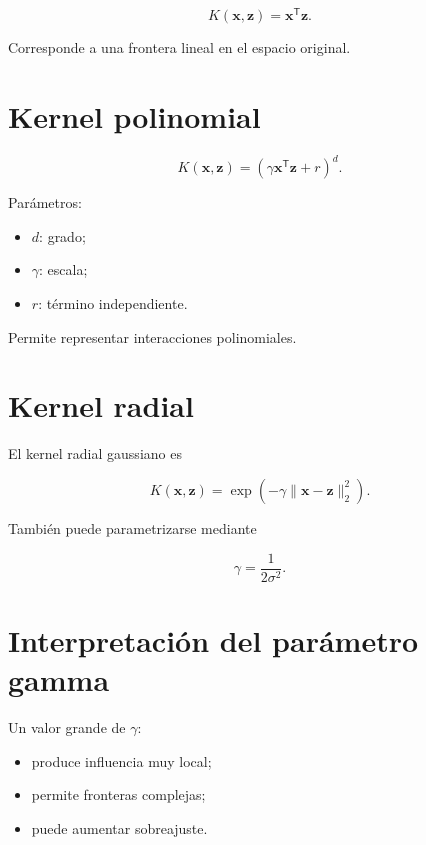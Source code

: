 \documentclass[
  spanish,
  10.5pt,
  letterpaper,
  DIV=11,
  numbers=noendperiod,
  oneside,
  open=any]{scrreprt}
\providecommand{\tightlist}{%
  \setlength{\itemsep}{0pt}\setlength{\parskip}{0pt}}
\theoremstyle{definition}
\theoremstyle{definition}
\theoremstyle{plain}
\theoremstyle{remark}
\begin{document}

\[
K(\mathbf{x},\mathbf{z})
=
\mathbf{x}^{\mathsf T}\mathbf{z}.
\]

Corresponde a una frontera lineal en el espacio original.

\section*{Kernel polinomial}\label{kernel-polinomial}


\[
K(\mathbf{x},\mathbf{z})
=
\left(
\gamma
\mathbf{x}^{\mathsf T}\mathbf{z}
+r
\right)^d.
\]

Parámetros:

\begin{itemize}
\tightlist
\item
  \(d\): grado;
\item
  \(\gamma\): escala;
\item
  \(r\): término independiente.
\end{itemize}

Permite representar interacciones polinomiales.

\section*{Kernel radial}\label{kernel-radial}


El kernel radial gaussiano es

\[
K(\mathbf{x},\mathbf{z})
=
\exp
\left(
-\gamma
\|\mathbf{x}-\mathbf{z}\|_2^2
\right).
\]

También puede parametrizarse mediante

\[
\gamma
=
\frac{1}{2\sigma^2}.
\]

\section*{Interpretación del parámetro
gamma}\label{interpretaciuxf3n-del-paruxe1metro-gamma}


Un valor grande de \(\gamma\):

\begin{itemize}
\tightlist
\item
  produce influencia muy local;
\item
  permite fronteras complejas;
\item
  puede aumentar sobreajuste.
\end{itemize}
\end{document}
